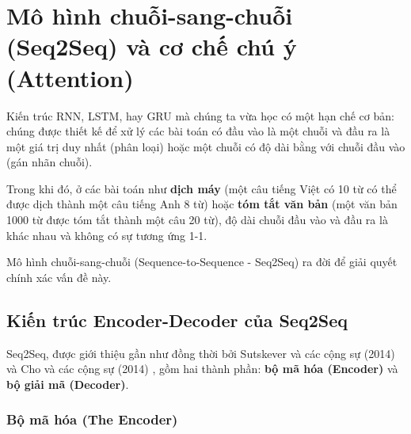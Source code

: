 
\section{Mô hình chuỗi-sang-chuỗi (Seq2Seq) và cơ chế chú ý (Attention)}
\label{sec:seq2seq_attention}

Kiến trúc RNN, LSTM, hay GRU mà chúng ta vừa học có một hạn chế cơ bản: chúng được thiết kế để xử lý các bài toán có đầu vào là một chuỗi và đầu ra là một giá trị duy nhất (phân loại) hoặc một chuỗi có độ dài bằng với chuỗi đầu vào (gán nhãn chuỗi).

Trong khi đó, ở các bài toán như \textbf{dịch máy} (một câu tiếng Việt có 10 từ có thể được dịch thành một câu tiếng Anh 8 từ) hoặc \textbf{tóm tắt văn bản} (một văn bản 1000 từ được tóm tắt thành một câu 20 từ), độ dài chuỗi đầu vào và đầu ra là khác nhau và không có sự tương ứng 1-1.

Mô hình chuỗi-sang-chuỗi (Sequence-to-Sequence - Seq2Seq) ra đời để giải quyết chính xác vấn đề này.

\subsection{Kiến trúc Encoder-Decoder của Seq2Seq}
\label{ssec:encoder_decoder}
Seq2Seq, được giới thiệu gần như đồng thời bởi Sutskever và các cộng sự (2014) \cite{sutskever2014sequence} và Cho và các cộng sự (2014) \cite{cho2014learning}, gồm hai thành phần: \textbf{bộ mã hóa (Encoder)} và \textbf{bộ giải mã (Decoder)}.

\begin{center}
    \label{fig:seq2seq_architecture}
\end{center}

\subsubsection{Bộ mã hóa (The Encoder)}
